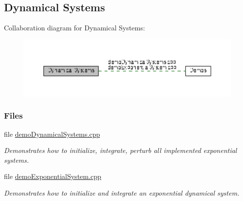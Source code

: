\hypertarget{group__DynamicalSystems}{\subsection{Dynamical Systems}
\label{group__DynamicalSystems}
}
Collaboration diagram for Dynamical Systems\+:
\nopagebreak
\begin{figure}[H]
\begin{center}
\leavevmode
\includegraphics[width=350pt]{group__DynamicalSystems}
\end{center}
\end{figure}
\subsubsection*{Files}
\begin{DoxyCompactItemize}
\item 
file \hyperlink{demoDynamicalSystems_8cpp}{demo\+Dynamical\+Systems.\+cpp}
\begin{DoxyCompactList}\small\item\em Demonstrates how to initialize, integrate, perturb all implemented exponential systems. \end{DoxyCompactList}\item 
file \hyperlink{demoExponentialSystem_8cpp}{demo\+Exponential\+System.\+cpp}
\begin{DoxyCompactList}\small\item\em Demonstrates how to initialize and integrate an exponential dynamical system. \end{DoxyCompactList}\end{DoxyCompactItemize}
